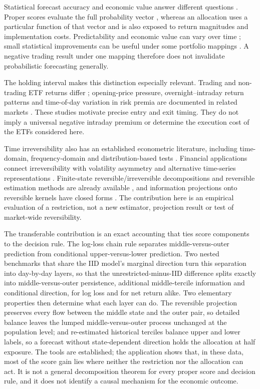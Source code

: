 Statistical forecast accuracy and economic value answer different questions \citep{Granger2000,Diebold1995}. Proper scores evaluate the full probability vector \citep{Gneiting2007}, whereas an allocation uses a particular function of that vector and is also exposed to return magnitudes and implementation costs. Predictability and economic value can vary over time \citep{Pesaran1995}; small statistical improvements can be useful under some portfolio mappings \citep{Campbell2008}. A negative trading result under one mapping therefore does not invalidate probabilistic forecasting generally.

The holding interval makes this distinction especially relevant. Trading and non-trading ETF returns differ \citep{Kelly2011}; opening-price pressure, overnight--intraday return patterns and time-of-day variation in risk premia are documented in related markets \citep{Berkman2012,Lou2019,Hendershott2020,Bondarenko2023}. These studies motivate precise entry and exit timing. They do not imply a universal negative intraday premium or determine the execution cost of the ETFs considered here.

Time irreversibility also has an established econometric literature, including time-domain, frequency-domain and distribution-based tests \citep{Ramsey1996,Hinich1998,Chen2000}. Financial applications connect irreversibility with volatility asymmetry and alternative time-series representations \citep{Chen2002,Zumbach2009,Lacasa2016}. Finite-state reversible/irreversible decompositions and reversible estimation methods are already available \citep{McCausland2007,Trendelkamp2015}, and information projections onto reversible kernels have closed forms \citep{WolferWatanabe2021}. The contribution here is an empirical evaluation of a restriction, not a new estimator, projection result or test of market-wide reversibility.

The transferable contribution is an exact accounting that ties score components to the decision rule. The log-loss chain rule separates middle-versus-outer prediction from conditional upper-versus-lower prediction. Two nested benchmarks that share the IID model's marginal direction turn this separation into day-by-day layers, so that the unrestricted-minus-IID difference splits exactly into middle-versus-outer persistence, additional middle-tercile information and conditional direction, for log loss and for net return alike. Two elementary properties then determine what each layer can do. The reversible projection preserves every flow between the middle state and the outer pair, so detailed balance leaves the lumped middle-versus-outer process unchanged at the population level; and re-estimated historical terciles balance upper and lower labels, so a forecast without state-dependent direction holds the allocation at half exposure. The tools are established; the application shows that, in these data, most of the score gain lies where neither the restriction nor the allocation can act. It is not a general decomposition theorem for every proper score and decision rule, and it does not identify a causal mechanism for the economic outcome.

